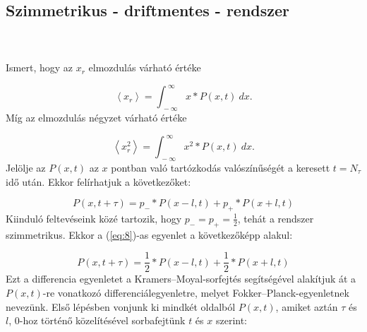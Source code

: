\section{} \label{sec:3}
\subsection{Szimmetrikus - driftmentes - rendszer} \label{subsec:3.1}
\\ \\
Ismert, hogy az $x_{r}$ elmozdulás várható értéke

\begin{equation} \label{eq:6}
    \left< x_{r} \right>
    =
    \int_{\ -\infty}^{\ \infty} x * P \left( x, t \right)\ dx.
\end{equation}
Míg az elmozdulás négyzet várható értéke

\begin{equation} \label{eq:7}
    \left< x_{r}^{2} \right>
    =
    \int_{\ -\infty}^{\ \infty} x^{2} * P \left( x, t \right)\ dx.
\end{equation}
Jelölje az $P \left( x, t \right)$ az $x$ pontban való tartózkodás valószínűségét a keresett $t = N_\tau$ idő után. Ekkor felírhatjuk a következőket\cite{randwalk}:

\begin{equation} \label{eq:8}
    P \left( x, t + \tau \right)
    =
    p_{-} * P \left( x - l, t \right) + p_{+} * P \left( x + l, t \right)
\end{equation}
Kiinduló feltevéseink közé tartozik, hogy $p_{-} = p_{+} = \frac{1}{2}$, tehát a rendszer szimmetrikus. Ekkor a (\ref{eq:8})-as egyenlet a következőképp alakul:

\begin{equation} \label{eq:9}
    P \left( x, t + \tau \right)
    =
    \frac{1}{2} * P \left( x - l, t \right) + \frac{1}{2} * P \left( x + l, t \right)
\end{equation}
Ezt a differencia egyenletet a Kramers--Moyal-sorfejtés segítségével alakítjuk át a $P \left( x, t \right)$-re vonatkozó differenciálegyenletre, melyet Fokker--Planck-egyenletnek nevezünk\cite{2007cond.mat..1242G}. Első lépésben vonjunk ki mindkét oldalból $P \left( x, t \right)$, amiket aztán $\tau$ és $l$, $0$-hoz történő közelítésével sorbafejtünk $t$ és $x$ szerint:

